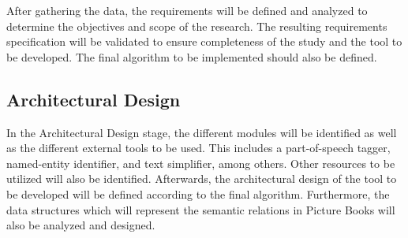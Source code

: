 After gathering the data, the requirements will be defined and analyzed to determine the objectives and scope of the research. The resulting requirements specification will be validated to ensure completeness of the study and the tool to be developed. The final algorithm to be implemented should also be defined.

\subsection{Architectural Design}

In the Architectural Design stage, the different modules will be identified as well as the different external tools to be used. This includes a part-of-speech tagger, named-entity identifier, and text simplifier, among others. Other resources to be utilized will also be identified. Afterwards, the architectural design of the tool to be developed will be defined according to the final algorithm. Furthermore, the data structures which will represent the semantic relations in Picture Books will also be analyzed and designed. 

